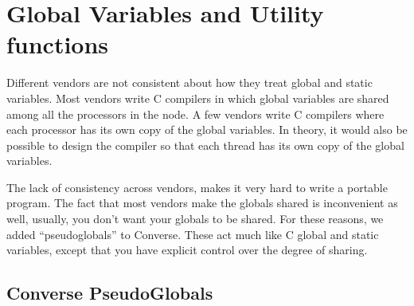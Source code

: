 %
%
%
%
%
%
%
%
%
%
%
%
%

\section{Global Variables and Utility functions}
\label{globalvars}

Different vendors are not consistent about how they treat global and static
variables.  Most vendors write C compilers in which global variables are
shared among all the processors in the node.  A few vendors write C
compilers where each processor has its own copy of the global variables.
In theory, it would also be possible to design the compiler so that
each thread has its own copy of the global variables.

The lack of consistency across vendors, makes it very hard to write a
portable program.  The fact that most vendors make the globals shared
is inconvenient as well, usually, you don't want your globals to be
shared.  For these reasons, we added ``pseudoglobals'' to Converse.
These act much like C global and static variables, except that you have
explicit control over the degree of sharing.

\subsection{Converse PseudoGlobals}

